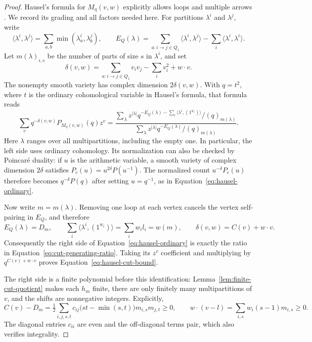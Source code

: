 \begin{proof}
Hausel's formula for $M_\eta(v,w)$ explicitly allows loops and multiple
arrows \cite[Equation~(9)]{Hausel06}.  We record its grading and all factors
needed here.  For partitions $\lambda^i$ and $\lambda^j$, write
\[
 \langle\lambda^i,\lambda^j\rangle
 =\sum_{a,b}\min(\lambda_a^i,\lambda_b^j),\qquad
 E_Q(\lambda)
 =\sum_{a:i\to j\in Q_1}\langle\lambda^i,\lambda^j\rangle
   -\sum_i\langle\lambda^i,\lambda^i\rangle.
\]
Let $m(\lambda)_{i,s}$ be the number of parts of size $s$ in $\lambda^i$,
and set
\[
 \delta(v,w)=\sum_{a:i\to j\in Q_1}v_iv_j
                  -\sum_i v_i^2+w\cdot v.
\]
The nonempty smooth variety has complex dimension $2\delta(v,w)$.
With $q=t^2$, where $t$ is the ordinary cohomological variable in Hausel's
formula, that formula reads
\begin{equation}\label{eq:hausel-ordinary}
 \sum_v q^{-\delta(v,w)}P_{M_\eta(v,w)}(q)z^v
 =
 \frac{\displaystyle\sum_{\lambda}
       z^{|\lambda|}
       q^{-E_Q(\lambda)-\sum_i\langle\lambda^i,(1^{w_i})\rangle}
       /(q)_{m(\lambda)}}
      {\displaystyle\sum_{\lambda}
       z^{|\lambda|}q^{-E_Q(\lambda)}/(q)_{m(\lambda)}}.
\end{equation}
Here $\lambda$ ranges over all multipartitions, including the empty one.
In particular, the left side uses ordinary cohomology.  Its normalization
can also be checked by Poincar\'e duality: if $u$ is the arithmetic
variable, a smooth variety of complex dimension $2\delta$ satisfies
$P_c(u)=u^{2\delta}P(u^{-1})$.  The normalized count $u^{-\delta}P_c(u)$
therefore becomes $q^{-\delta}P(q)$ after setting $u=q^{-1}$, as in
Equation~\eqref{eq:hausel-ordinary}.

Now write $m=m(\lambda)$.  Removing one loop at each vertex cancels the
vertex self-pairing in $E_Q$, and therefore
\[
 E_Q(\lambda)=D_m,
 \qquad
 \sum_i\langle\lambda^i,(1^{w_i})\rangle
 =\sum_i w_i l_i=w(m),
 \qquad
 \delta(v,w)=C(v)+w\cdot v.
\]
Consequently the right side of Equation~\eqref{eq:hausel-ordinary} is
exactly the ratio in Equation~\eqref{eq:cut-generating-ratio}.
Taking its $z^v$ coefficient and multiplying by $q^{C(v)+w\cdot v}$ proves
Equation~\eqref{eq:hausel-cut-bound}.

The right side is a finite polynomial before this identification:
Lemma~\ref{lem:finite-cut-quotient} makes each $h_m$ finite, there are only
finitely many multipartitions of $v$, and the shifts are nonnegative
integers.  Explicitly,
\[
 C(v)-D_m
 =\tfrac12\sum_{i,j,s,t}c_{ij}
          \bigl(st-\min(s,t)\bigr)m_{i,s}m_{j,t}\geq0,
 \qquad
 w\cdot(v-l)=\sum_{i,s}w_i(s-1)m_{i,s}\geq0.
\]
The diagonal entries $c_{ii}$ are even and the off-diagonal terms pair,
which also verifies integrality.
\end{proof}

